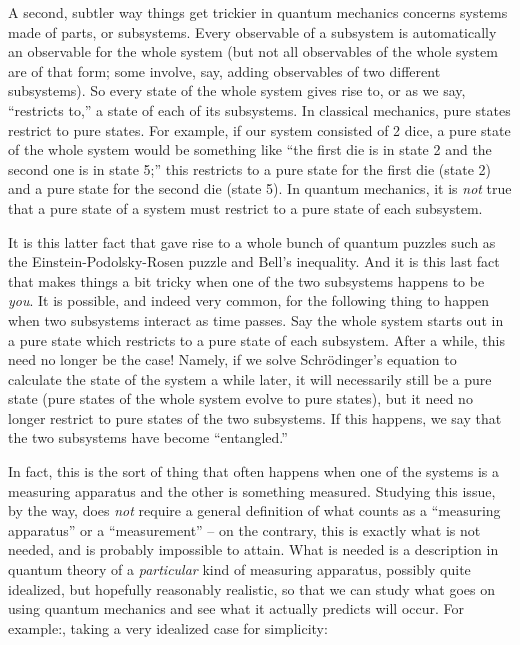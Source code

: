 \documentclass[12pt]{article}
\begin{document}
A second, subtler way things get trickier in quantum mechanics concerns
systems made of parts, or subsystems. Every observable of a subsystem is
automatically an observable for the whole system (but not all
observables of the whole system are of that form; some involve, say,
adding observables of two different subsystems). So every state of the
whole system gives rise to, or as we say, ``restricts to,'' a state of
each of its subsystems. In classical mechanics, pure states restrict to
pure states. For example, if our system consisted of 2 dice, a pure
state of the whole system would be something like ``the first die is in
state 2 and the second one is in state 5;'' this restricts to a pure
state for the first die (state 2) and a pure state for the second die
(state 5). In quantum mechanics, it is \emph{not} true that a pure state
of a system must restrict to a pure state of each subsystem.

It is this latter fact that gave rise to a whole bunch of quantum
puzzles such as the Einstein-Podolsky-Rosen puzzle and Bell's
inequality. And it is this last fact that makes things a bit tricky when
one of the two subsystems happens to be \emph{you}. It is possible, and
indeed very common, for the following thing to happen when two
subsystems interact as time passes. Say the whole system starts out in a
pure state which restricts to a pure state of each subsystem. After a
while, this need no longer be the case! Namely, if we solve
Schr\"odinger's equation to calculate the state of the system a while
later, it will necessarily still be a pure state (pure states of the
whole system evolve to pure states), but it need no longer restrict to
pure states of the two subsystems. If this happens, we say that the two
subsystems have become ``entangled.''

In fact, this is the sort of thing that often happens when one of the
systems is a measuring apparatus and the other is something measured.
Studying this issue, by the way, does \emph{not} require a general
definition of what counts as a ``measuring apparatus'' or a
``measurement'' -- on the contrary, this is exactly what is not needed,
and is probably impossible to attain. What is needed is a description in
quantum theory of a \emph{particular} kind of measuring apparatus,
possibly quite idealized, but hopefully reasonably realistic, so that we
can study what goes on using quantum mechanics and see what it actually
predicts will occur. For example:, taking a very idealized case for
simplicity:
\end{document}
